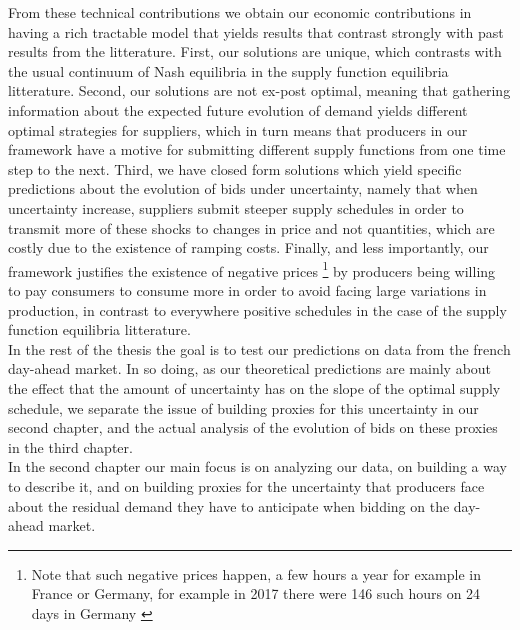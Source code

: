 From these technical contributions we obtain our economic contributions in having a rich tractable model that yields results that contrast strongly with past results from the litterature. First, our solutions are unique, which contrasts with the usual continuum of Nash equilibria in the supply function equilibria litterature. Second, our solutions are not ex-post optimal, meaning that gathering information about the expected future evolution of demand yields different optimal strategies for suppliers, which in turn means that producers in our framework have a motive for submitting different supply functions from one time step to the next. Third, we have closed form solutions which yield specific predictions about the evolution of bids under uncertainty, namely that when uncertainty increase, suppliers submit steeper supply schedules in order to transmit more of these shocks to changes in price and not quantities, which are costly due to the existence of ramping costs. Finally, and less importantly, our framework justifies the existence of negative prices \footnote{Note that such negative prices happen, a few hours a year for example in France or Germany,  for example in 2017 there were 146 such hours on 24 days in Germany \cite{epexnegP}} by producers being willing to pay consumers to consume more in order to avoid facing large variations in production, in contrast to everywhere positive schedules in the case of the supply function equilibria litterature.\\

In the rest of the thesis the goal is to test our predictions on data from the french day-ahead market. In so doing, as our theoretical predictions are mainly about the effect that the amount of uncertainty has on the slope of the optimal supply schedule, we separate the issue of building proxies for this uncertainty in our second chapter, and the actual analysis of the evolution of bids on these proxies in the third chapter.\\

In the second chapter our main focus is on analyzing our data, on building a way to describe it, and on building proxies for the uncertainty that producers face about the residual demand they have to anticipate when bidding on the day-ahead market. \\

